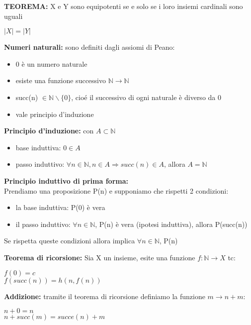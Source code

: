 \documentclass[11pt, letterpaper]{article}
\begin{document}
\textbf{TEOREMA:} X e Y sono equipotenti se e solo se i loro insiemi cardinali sono uguali
\begin{center}
    $|X|=|Y|$
\end{center}

\textbf{Numeri naturali:} sono definiti dagli assiomi di Peano:
\begin{itemize}
    \item 0 è un numero naturale
    \item esiste una funzione successivo $\mathbb{N}\rightarrow\mathbb{N}$
    \item succ(n) $\in\mathbb{N}\backslash\{0\}$, cioé il successivo di ogni naturale è diverso da 0
    \item vale principio d'induzione
\end{itemize}

\textbf{Principio d'induzione:} con $A\subset\mathbb{N}$ 
\begin{itemize}
    \item base induttiva: $0\in A$
    \item passo induttivo: $\forall n \in\mathbb{N}, n\in A\Rightarrow succ(n)\in A$, allora $A=\mathbb{N}$
\end{itemize}

\newpage

\textbf{Principio induttivo di prima forma:}\\
Prendiamo una proposizione P(n) e supponiamo che rispetti 2 condizioni:
\begin{itemize}
    \item la base induttiva: P(0) è vera
    \item il passo induttivo: $\forall n \in\mathbb{N}$, P(n) è vera (ipotesi induttiva), allora P(succ(n))
\end{itemize}
Se rispetta queste condizioni allora implica $\forall n\in\mathbb{N}$, P(n)

\textbf{Teorema di ricorsione:} Sia X un insieme, esite una funzione $f:\mathbb{N}\rightarrow X$ tc:
\begin{center}
    $f(0) = c$\\
    $f(succ(n))=h(n,f(n))$
\end{center}

\textbf{Addizione:} tramite il teorema di ricorsione definiamo la funzione $m\rightarrow n+m:$
\begin{center}
    $n + 0 = n$\\
    $n+succ(m)=succe(n)+m$
\end{center}
\end{document}
